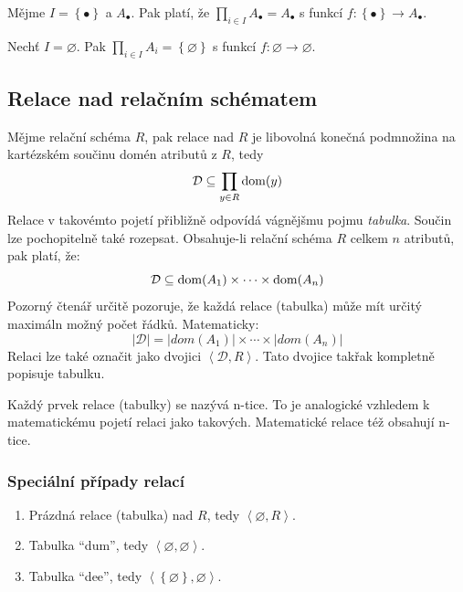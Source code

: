 \begin{upexample}
Mějme $I = \left\{ \bullet \right\}$ a $A_{\bullet}$. Pak platí, že $\prod_{i \in I} A_{\bullet} = A_{\bullet}$ s funkcí $f: \left\{ \bullet \right\} \rightarrow A_{\bullet}$.
\end{upexample}

\begin{upexample}
Nechť $I = \varnothing$. Pak $\prod_{i \in I} A_{i} = \left\{ \varnothing \right\}$ s funkcí $f: \varnothing \rightarrow \varnothing$.
\end{upexample}

\subsection{Relace nad relačním schématem}
\begin{uptheorem}
Mějme relační schéma $R$, pak relace nad $R$ je libovolná konečná podmnožina na kartézském součinu domén atributů z $R$, tedy
$$
\mathcal{D} \subseteq \prod_{y \in R} \operatorname{dom}(y)
$$
Relace v takovémto pojetí přibližně odpovídá vágnějšmu pojmu \textit{tabulka}. Součin lze pochopitelně také rozepsat. Obsahuje-li relační schéma $R$ celkem $n$ atributů, pak platí, že:
$$
\mathcal{D} \subseteq \operatorname{dom}(A_{1}) \times \cdots \times \operatorname{dom}(A_{n})
$$
Pozorný čtenář určitě pozoruje, že každá relace (tabulka) může mít určitý maximáln možný počet řádků. Matematicky:
$$
\left|\mathcal{D}\right| = \left|dom(A_{1})\right| \times \cdots \times \left|dom(A_{n})\right|
$$
Relaci lze také označit jako dvojici $\left\langle \mathcal{D}, R \right\rangle$. Tato dvojice takřak kompletně popisuje tabulku.
\end{uptheorem}
Každý prvek relace (tabulky) se nazývá n-tice. To je analogické vzhledem k matematickému pojetí relaci jako takových. Matematické relace též obsahují n-tice.

\subsubsection{Speciální případy relací}
\begin{enumerate}
\item Prázdná relace (tabulka) nad $R$, tedy $\left\langle \varnothing, R \right\rangle$.
\item Tabulka \enquote{dum}, tedy $\left\langle \varnothing, \varnothing \right\rangle$.
\item Tabulka \enquote{dee}, tedy $\left\langle \left\{ \varnothing \right\}, \varnothing \right\rangle$.
\end{enumerate}

